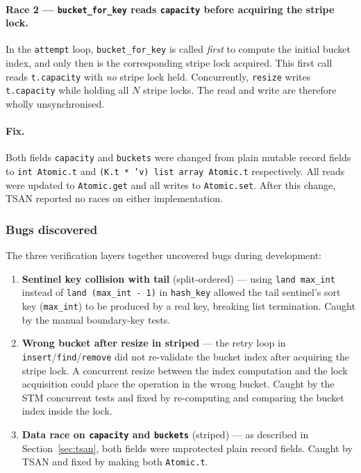 \documentclass[11pt,a4paper]{article}
\begin{document}
\paragraph{Race 2 — \texttt{bucket\_for\_key} reads \texttt{capacity} before
acquiring the stripe lock.}
In the \texttt{attempt} loop, \texttt{bucket\_for\_key} is called \emph{first}
to compute the initial bucket index, and only then is the corresponding stripe
lock acquired. This first call reads \texttt{t.capacity} with \emph{no} stripe
lock held. Concurrently, \texttt{resize} writes \texttt{t.capacity} while
holding all $N$ stripe locks. The read and write are therefore wholly
unsynchronised.

\paragraph{Fix.}
Both fields \texttt{capacity} and \texttt{buckets} were changed from plain
mutable record fields to \texttt{int Atomic.t} and
\texttt{(K.t * 'v) list array Atomic.t} respectively. All reads were updated
to \texttt{Atomic.get} and all writes to \texttt{Atomic.set}. After this
change, TSAN reported no races on either implementation.

\subsubsection{Bugs discovered}

The three verification layers together uncovered bugs during development:

\begin{enumerate}

  \item \textbf{Sentinel key collision with tail} (split-ordered) — using
        \texttt{land max\_int} instead of \texttt{land (max\_int - 1)} in
        \texttt{hash\_key} allowed the tail sentinel's sort key (\texttt{max\_int})
        to be produced by a real key, breaking list termination. Caught by
        the manual boundary-key tests.
        
  \item \textbf{Wrong bucket after resize in striped} — the retry loop in
        \texttt{insert}/\texttt{find}/\texttt{remove} did not re-validate the
        bucket index after acquiring the stripe lock. A concurrent resize
        between the index computation and the lock acquisition could place
        the operation in the wrong bucket. Caught by the STM concurrent tests
        and fixed by re-computing and comparing the bucket index inside the lock.

  \item \textbf{Data race on \texttt{capacity} and \texttt{buckets}} (striped)
        — as described in Section~\ref{sec:tsan}, both fields were unprotected
        plain record fields. Caught by TSAN and fixed by making both
        \texttt{Atomic.t}.
\end{enumerate}
\end{document}
